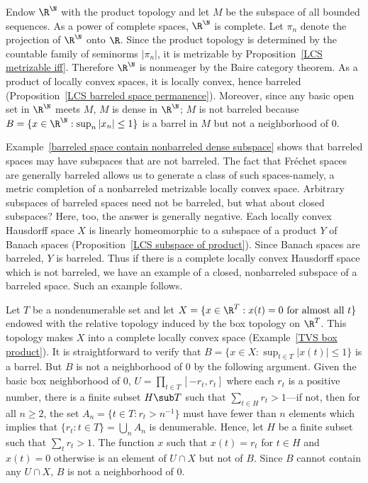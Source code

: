 \begin{example}\label{barreled space contain nonbarreled dense subspace}
Endow $\R^\N$ with the product topology and let $M$ be the subspace of all bounded sequences. As a power of complete spaces, $\R^\N$ is complete. Let $\pi_n$ denote the projection of $\R^\N$ onto $\R$. Since the product topology is determined by the countable family of seminorms $|\pi_n|$, it is metrizable by Proposition~\ref{LCS metrizable iff}. Therefore $\R^\N$ is nonmeager by the Baire category theorem. As a product of locally convex spaces, it is locally convex, hence barreled (Proposition~\ref{LCS barreled space permanence}). Moreover, since any basic open set in $\R^\N$ meets $M$, $M$ is dense in $\R^\N$; $M$ is not barreled because $B=\{x\in\R^\N:\sup_n|x_n|\leq 1\}$ is a barrel in $M$ but not a neighborhood of $0$.
\end{example}
Example~\ref{barreled space contain nonbarreled dense subspace} shows that barreled spaces may have subspaces that are not barreled. The fact that Fr\'echet spaces are generally barreled allows us to generate a class of such spaces-namely, a metric completion of a nonbarreled metrizable locally convex space. Arbitrary subspaces of barreled spaces need not be barreled, but what about closed subspaces? Here, too, the answer is generally negative. Each locally convex Hausdorff space $X$ is linearly homeomorphic to a subspace of a product $Y$ of Banach spaces (Proposition~\ref{LCS subspace of product}). Since Banach spaces are barreled, $Y$ is barreled. Thus if there is a complete locally convex Hausdorff space which is not barreled, we have an example of a closed, nonbarreled subspace of a barreled space. Such an example follows.
\begin{example}
Let $T$ be a nondenumerable set and let $X=\{x\in\R^T:\text{$x(t)=0$ for almost all $t$}\}$ endowed with the relative topology induced by the box topology on $\R^T$. This topology makes $X$ into a complete locally convex space (Example~\ref{TVS box product}). It is straightforward to verify that $B=\{x\in X:\sup_{t\in T}|x(t)|\leq 1\}$ is a barrel. But $B$ is not a neighborhood of $0$ by the following argument. Given the basic box neighborhood of $0$, $U=\prod_{t\in T}[-r_t,r_t]$ where each $r_t$ is a positive number, there is a finite subset $H\sub T$ such that $\sum_{t\in H}r_t>1$---if not, then for all $n\geq 2$, the set $A_n=\{t\in T:r_t>n^{-1}\}$ must have fewer than $n$ elements which implies that $\{r_t:t\in T\}=\bigcup_nA_n$ is denumerable. Hence, let $H$ be a finite subset such that $\sum_tr_t>1$. The function $x$ such that $x(t)=r_t$ for $t\in H$ and $x(t)=0$ otherwise is an element of $U\cap X$ but not of $B$. Since $B$ cannot contain any $U\cap X$, $B$ is not a neighborhood of $0$.
\end{example}
